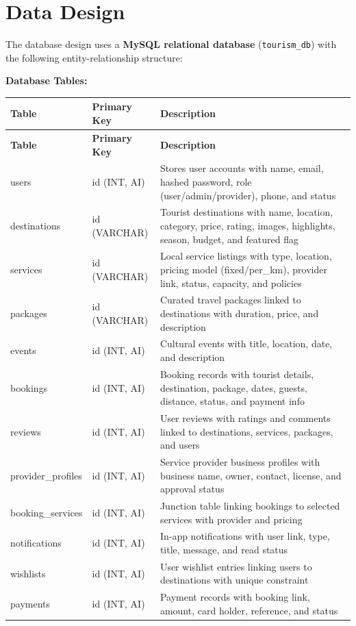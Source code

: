 \section{Data Design}

The database design uses a \textbf{MySQL relational database} (\texttt{tourism\_db}) with the following entity-relationship structure:

\textbf{Database Tables:}

\begin{longtable}{|p{3.5cm}|p{3cm}|p{6.5cm}|}
\hline
\textbf{Table} & \textbf{Primary Key} & \textbf{Description} \\
\hline
\endfirsthead
\hline
\textbf{Table} & \textbf{Primary Key} & \textbf{Description} \\
\hline
\endhead
users & id (INT, AI) & Stores user accounts with name, email, hashed password, role (user/admin/provider), phone, and status \\
\hline
destinations & id (VARCHAR) & Tourist destinations with name, location, category, price, rating, images, highlights, season, budget, and featured flag \\
\hline
services & id (VARCHAR) & Local service listings with type, location, pricing model (fixed/per\_km), provider link, status, capacity, and policies \\
\hline
packages & id (VARCHAR) & Curated travel packages linked to destinations with duration, price, and description \\
\hline
events & id (INT, AI) & Cultural events with title, location, date, and description \\
\hline
bookings & id (INT, AI) & Booking records with tourist details, destination, package, dates, guests, distance, status, and payment info \\
\hline
reviews & id (INT, AI) & User reviews with ratings and comments linked to destinations, services, packages, and users \\
\hline
provider\_profiles & id (INT, AI) & Service provider business profiles with business name, owner, contact, license, and approval status \\
\hline
booking\_services & id (INT, AI) & Junction table linking bookings to selected services with provider and pricing \\
\hline
notifications & id (INT, AI) & In-app notifications with user link, type, title, message, and read status \\
\hline
wishlists & id (INT, AI) & User wishlist entries linking users to destinations with unique constraint \\
\hline
payments & id (INT, AI) & Payment records with booking link, amount, card holder, reference, and status \\
\hline
\end{longtable}

